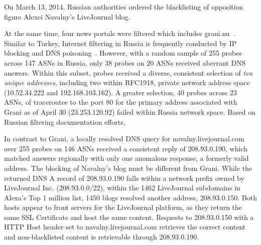 On March 13, 2014, Russian authorities ordered the blacklisting of opposition
figure Alexei Navalny's LiveJournal blog.

At the same time, four news portals were filtered which includes
grani.nu~\cite{ibtimes2014russia}.  Similar to Turkey, Internet filtering in
Russia is frequently conducted by IP blocking and DNS
poisoning~\cite{rugovdns,verkamp2012inferring}.  However, with a random sample
of 255 probes across 147 ASNs in Russia, only 38 probes on 20 ASNs received
aberrant DNS answers. Within this subset, probes received a diverse, consistent
selection of \emph{ten unique addresses}, including two within RFC1918, private
network address space (10.52.34.222 and 192.168.103.162). A greater selection,
40 probes across 23 ASNs, of traceroutes to the port 80 for the primary address
associated with Grani as of April 30 (23.253.120.92) failed within Russia
network space. Based on Russian filtering documentation efforts,

In contrast to Grani, a locally resolved DNS query for navalny.livejournal.com
over 255 probes on 146 ASNs received a consistent reply of 208.93.0.190, which
matched answers regionally with only one anomalous response, a formerly valid
address. The blocking of Navalny's blog must be different from Grani. While the
returned DNS A record of 208.93.0.190 falls within a network prefix owned by
LiveJournal Inc. (208.93.0.0/22), within the 1462 LiveJournal subdomains in
Alexa's Top 1 million list, 1450 blogs resolved another address, 208.93.0.150.
Both hosts appear to front servers for the LiveJournal platform, as they return
the same SSL Certificate and host the same content. Requests to 208.93.0.150
with a HTTP Host header set to navalny.livejournal.com retrieves the correct
content and non-blacklisted content is retrievable through 208.93.0.190.

